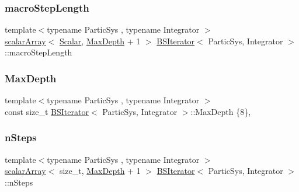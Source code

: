 \mbox{\label{class_b_s_iterator_a96c58777cbefe7d02e160317621fc0b9}} 
\subsubsection{\texorpdfstring{macro\+Step\+Length}{macroStepLength}}
{\footnotesize\ttfamily template$<$typename Partic\+Sys , typename Integrator $>$ \\
\mbox{\hyperlink{class_b_s_iterator_ab0aa7c10b56500273af05dcd85fd8389}{scalar\+Array}}$<$ \mbox{\hyperlink{class_b_s_iterator_a7857f8ff9032955ea4dcc22cd18ca7a1}{Scalar}}, \mbox{\hyperlink{class_b_s_iterator_a39409b9a12d4854d101ce59a0efc0f74}{Max\+Depth}} + 1 $>$ \mbox{\hyperlink{class_b_s_iterator}{B\+S\+Iterator}}$<$ Partic\+Sys, Integrator $>$\+::macro\+Step\+Length\hspace{0.3cm}{\ttfamily [private]}}

\mbox{\label{class_b_s_iterator_a39409b9a12d4854d101ce59a0efc0f74}} 
\subsubsection{\texorpdfstring{Max\+Depth}{MaxDepth}}
{\footnotesize\ttfamily template$<$typename Partic\+Sys , typename Integrator $>$ \\
const size\+\_\+t \mbox{\hyperlink{class_b_s_iterator}{B\+S\+Iterator}}$<$ Partic\+Sys, Integrator $>$\+::Max\+Depth \{8\}\hspace{0.3cm}{\ttfamily [static]}, {\ttfamily [private]}}

\mbox{\label{class_b_s_iterator_a9c4c8c17a759cdff694e0bd62ed249bd}} 
\subsubsection{\texorpdfstring{n\+Steps}{nSteps}}
{\footnotesize\ttfamily template$<$typename Partic\+Sys , typename Integrator $>$ \\
\mbox{\hyperlink{class_b_s_iterator_ab0aa7c10b56500273af05dcd85fd8389}{scalar\+Array}}$<$ size\+\_\+t, \mbox{\hyperlink{class_b_s_iterator_a39409b9a12d4854d101ce59a0efc0f74}{Max\+Depth}} + 1 $>$ \mbox{\hyperlink{class_b_s_iterator}{B\+S\+Iterator}}$<$ Partic\+Sys, Integrator $>$\+::n\+Steps\hspace{0.3cm}{\ttfamily [private]}}

